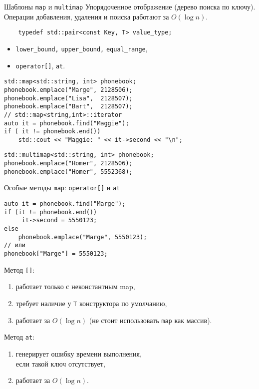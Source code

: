 \documentclass{beamer}
\begin{document}
\begin{frame}[fragile]{Шаблоны {\tt map} и {\tt multimap}}
Упорядоченное отображение (дерево поиска по ключу).\\ 
Операции добавления, удаления и поиска работают за $O(\log n)$.
\begin{lstlisting}
    typedef std::pair<const Key, T> value_type;
\end{lstlisting}\vspace{-1mm}

\begin{itemize}
    \item {\tt lower\_bound,} {\tt upper\_bound,} {\tt equal\_range},
    \item {\tt operator[]}, {\tt at}.
\end{itemize}\vspace{-1mm}
\begin{lstlisting}
std::map<std::string, int> phonebook;
phonebook.emplace("Marge", 2128506);
phonebook.emplace("Lisa",  2128507);
phonebook.emplace("Bart",  2128507);
// std::map<string,int>::iterator
auto it = phonebook.find("Maggie");
if ( it != phonebook.end())
    std::cout << "Maggie: " << it->second << "\n";
\end{lstlisting}\vspace{-1mm}
\begin{lstlisting}
std::multimap<std::string, int> phonebook;
phonebook.emplace("Homer", 2128506);
phonebook.emplace("Homer", 5552368);
\end{lstlisting}
\end{frame}

\begin{frame}[fragile]{Особые методы {\tt map}: {\tt operator[]} и {\tt at}}
\begin{lstlisting}
auto it = phonebook.find("Marge");
if (it != phonebook.end())
     it->second = 5550123;
else 
    phonebook.emplace("Marge", 5550123);
// или
phonebook["Marge"] = 5550123;
\end{lstlisting}
Метод {\tt {}[]}:
\begin{enumerate}
    \item работает только с неконстантным map,
    \item требует наличие у {\tt T} конструктора по умолчанию,
    \item работает за $O(\log n)$
    (не стоит использовать {\tt map} как массив).
\end{enumerate}
Метод {\tt at}:
\begin{enumerate}
    \item генерирует ошибку времени выполнения,\\
         если такой ключ отсутствует,
    \item работает за $O(\log n)$.
\end{enumerate}
\end{frame}
\end{document}
